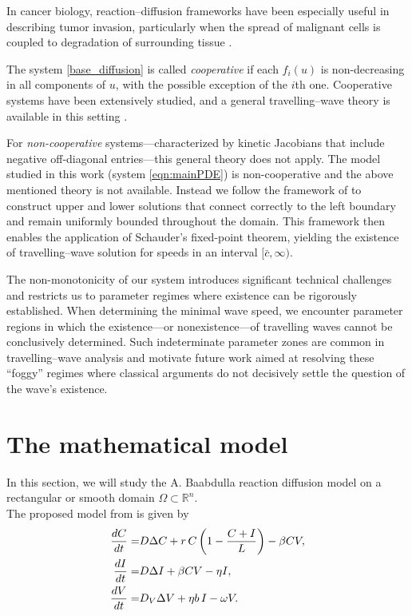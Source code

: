 \documentclass[11pt]{article}
\theoremstyle{definition}
\begin{document}
In cancer biology, reaction–diffusion frameworks have been especially useful in describing tumor invasion, particularly when the spread of malignant cells is coupled to degradation of surrounding tissue \cite{El-HachemMaud2021Twao_travelingwave}.  

The system \eqref{base_diffusion} is called \emph{cooperative} if each $f_i(u)$ is non-decreasing in all components of $u$, with the possible exception of the $i$th one. Cooperative systems have been extensively studied, and a general travelling–wave theory is available in this setting \cite{FangJian2009MWfP, WeinbergerHansF.2002Aold, LiangXing2007Asos}.

For \emph{non-cooperative} systems—characterized by kinetic Jacobians that include negative off-diagonal entries—this general theory does not apply. The model studied in this work (system \eqref{eqn:mainPDE}) is non-cooperative and the above mentioned theory is not available. Instead we follow the framework of \cite{ThiessenRyan2026Twst} to construct upper and lower solutions that connect correctly to the left boundary and remain uniformly bounded throughout the domain. This framework then enables the application of Schauder’s fixed-point theorem, yielding the existence of travelling–wave solution for speeds in an interval $[\bar c, \infty)$.

The non-monotonicity of our system introduces significant technical challenges and restricts us to parameter regimes where existence can be rigorously established. When determining the minimal wave speed, we encounter parameter regions in which the existence—or nonexistence—of travelling waves cannot be conclusively determined. Such indeterminate parameter zones are common in travelling–wave analysis and motivate future work aimed at resolving these ``foggy'' regimes where classical arguments do not decisively settle the question of the wave's existence.




\section{The mathematical model}\label{sec:model}
In this section, we will study the A. Baabdulla \cite{arwa} reaction diffusion
model on a rectangular or smooth domain $\Omega \subset \mathbb{R}^n$.\\
The proposed model from \cite{arwa} is given by 
\begin{align}
\label{eqn:main_PDE}
\notag
\frac{dC}{dt}=&D \Delta C 
+ r\,C\left(1-\frac{C+I}{L}\right)
- \beta C V,\\
\frac{dI}{dt}=&D \Delta I
+ \beta C V 
- \eta I,\\ \notag
\frac{dV}{dt}=&D_V \Delta V 
+ \eta b\, I
- \omega V.
\end{align}
\end{document}

